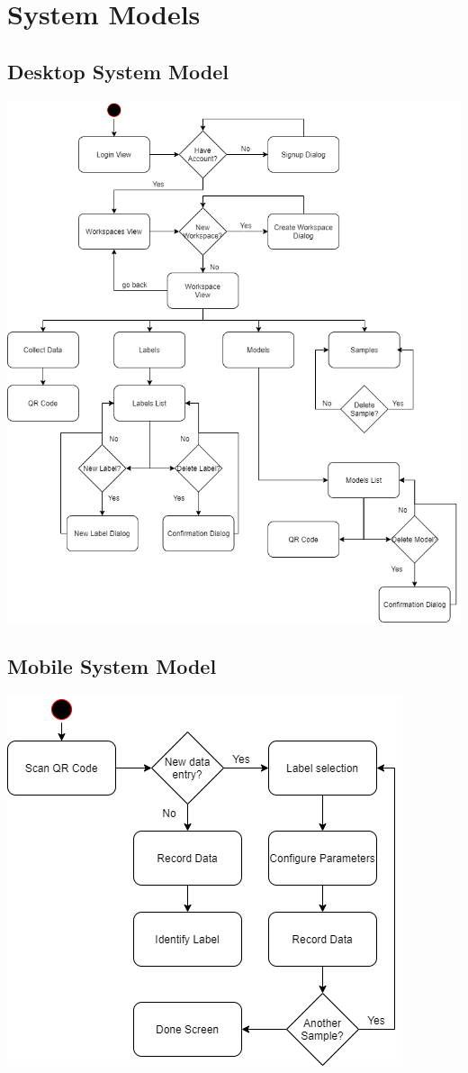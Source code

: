 \section{System Models}
\subsection{Desktop System Model}
\includegraphics[width = \textwidth]{charts/flow1.png}
\subsection{Mobile System Model}
\includegraphics[width = \textwidth]{charts/flow2.png}